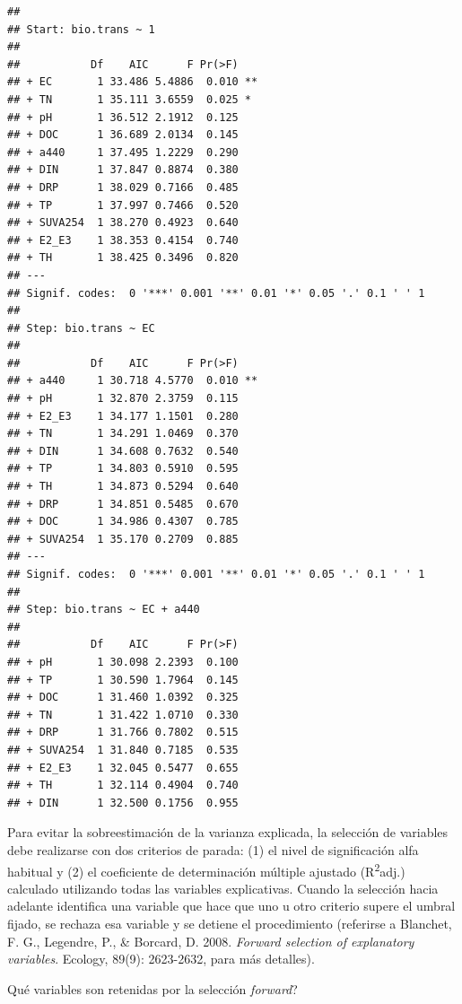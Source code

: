 \documentclass[
]{book}
\newenvironment{Shaded}{\begin{snugshade}}{\end{snugshade}}
\newcommand{\NormalTok}[1]{#1}
\newcommand{\SpecialCharTok}[1]{\textcolor[rgb]{0.00,0.00,0.00}{#1}}
\begin{document}
\begin{verbatim}
## 
## Start: bio.trans ~ 1 
## 
##           Df    AIC      F Pr(>F)   
## + EC       1 33.486 5.4886  0.010 **
## + TN       1 35.111 3.6559  0.025 * 
## + pH       1 36.512 2.1912  0.125   
## + DOC      1 36.689 2.0134  0.145   
## + a440     1 37.495 1.2229  0.290   
## + DIN      1 37.847 0.8874  0.380   
## + DRP      1 38.029 0.7166  0.485   
## + TP       1 37.997 0.7466  0.520   
## + SUVA254  1 38.270 0.4923  0.640   
## + E2_E3    1 38.353 0.4154  0.740   
## + TH       1 38.425 0.3496  0.820   
## ---
## Signif. codes:  0 '***' 0.001 '**' 0.01 '*' 0.05 '.' 0.1 ' ' 1
## 
## Step: bio.trans ~ EC 
## 
##           Df    AIC      F Pr(>F)   
## + a440     1 30.718 4.5770  0.010 **
## + pH       1 32.870 2.3759  0.115   
## + E2_E3    1 34.177 1.1501  0.280   
## + TN       1 34.291 1.0469  0.370   
## + DIN      1 34.608 0.7632  0.540   
## + TP       1 34.803 0.5910  0.595   
## + TH       1 34.873 0.5294  0.640   
## + DRP      1 34.851 0.5485  0.670   
## + DOC      1 34.986 0.4307  0.785   
## + SUVA254  1 35.170 0.2709  0.885   
## ---
## Signif. codes:  0 '***' 0.001 '**' 0.01 '*' 0.05 '.' 0.1 ' ' 1
## 
## Step: bio.trans ~ EC + a440 
## 
##           Df    AIC      F Pr(>F)
## + pH       1 30.098 2.2393  0.100
## + TP       1 30.590 1.7964  0.145
## + DOC      1 31.460 1.0392  0.325
## + TN       1 31.422 1.0710  0.330
## + DRP      1 31.766 0.7802  0.515
## + SUVA254  1 31.840 0.7185  0.535
## + E2_E3    1 32.045 0.5477  0.655
## + TH       1 32.114 0.4904  0.740
## + DIN      1 32.500 0.1756  0.955
\end{verbatim}

Para evitar la sobreestimación de la varianza explicada, la selección de variables debe realizarse con dos criterios de parada: (1) el nivel de significación alfa habitual y (2) el coeficiente de determinación múltiple ajustado (R\textsuperscript{2}adj.) calculado utilizando todas las variables explicativas. Cuando la selección hacia adelante identifica una variable que hace que uno u otro criterio supere el umbral fijado, se rechaza esa variable y se detiene el procedimiento (referirse a Blanchet, F. G., Legendre, P., \& Borcard, D. 2008. \emph{Forward selection of explanatory variables}. Ecology, 89(9): 2623-2632, para más detalles).

Qué variables son retenidas por la selección \emph{forward}?

\begin{Shaded}
\end{Shaded}
\end{document}
